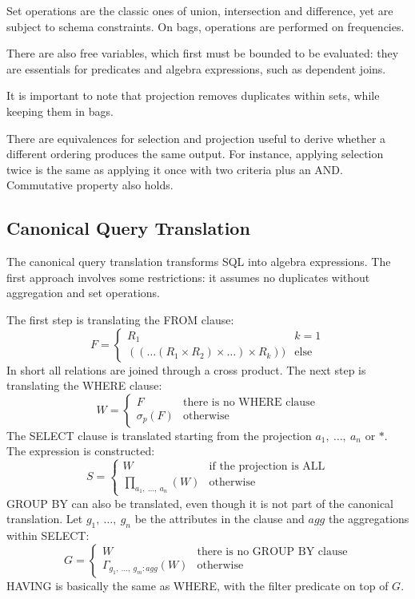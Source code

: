 Set operations are the classic ones of union, intersection and difference, yet are subject to schema constraints. On bags, operations are performed on frequencies. 

There are also free variables, which first must be bounded to be evaluated: they are essentials for predicates and algebra expressions, such as dependent joins. 

It is important to note that projection removes duplicates within sets, while keeping them in bags.

There are equivalences for selection and projection useful to derive whether a different ordering produces the same output. For instance, applying selection twice is the same as applying it once with two criteria plus an AND. Commutative property also holds.

\subsection{Canonical Query Translation}
The canonical query translation transforms SQL into algebra expressions. The first approach involves some restrictions: it assumes no duplicates without aggregation and set operations.

The first step is translating the FROM clause:
$$F = \begin{cases}
R_1 & k = 1 \\
((\dots (R_1 \times R_2) \times \dots) \times R_k)) & \text{else}
\end{cases}$$
In short all relations are joined through a cross product. The next step is translating the WHERE clause:
$$W = \begin{cases}
F & \text{there is no WHERE clause} \\
\sigma_p(F) & \text{otherwise}
\end{cases}$$
The SELECT clause is translated starting from the projection $a_1,\ \dots,\ a_n$ or $*$. The expression is constructed:
$$S = \begin{cases}
W & \text{if the projection is ALL} \\
\prod_{a_1,\ \dots,\ a_n}(W) & \text{otherwise}
\end{cases}$$
GROUP BY can also be translated, even though it is not part of the canonical translation. Let $g_1,\ \dots,\ g_n$ be the attributes in the clause and $agg$ the aggregations within SELECT:
$$G = \begin{cases}
W & \text{there is no GROUP BY clause} \\
\Gamma_{g_1,\ \dots,\ g_m:agg}(W) & \text{otherwise}
\end{cases}$$
HAVING is basically the same as WHERE, with the filter predicate on top of $G$.

